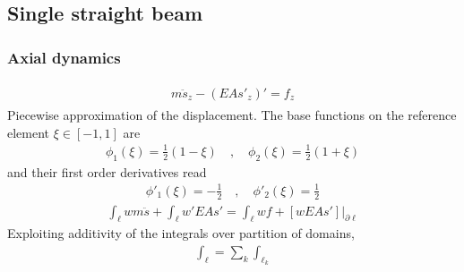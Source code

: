 \documentclass[letterpaper,10pt,english]{jupyterBook}
\begin{document}
\subsection{Single straight beam}
\label{\detokenize{ch/solids/small-displacements-fem-beams-decoupled:single-straight-beam}}

\subsubsection{Axial dynamics}
\label{\detokenize{ch/solids/small-displacements-fem-beams-decoupled:axial-dynamics}}\begin{equation*}
\begin{split}\begin{aligned}
  m \ddot{s}_z - \left( EA s'_z \right)' = f_z
\end{aligned}\end{split}
\end{equation*}
\sphinxAtStartPar
Piecewise  approximation of the displacement. The base functions on the reference element \(\xi \in [-1,1]\) are
\begin{equation*}
\begin{split}
  \phi_1(\xi) = \frac{1}{2} \left( 1 - \xi \right) \quad , \quad
  \phi_2(\xi) = \frac{1}{2} \left( 1 + \xi \right) 
\end{split}
\end{equation*}
\sphinxAtStartPar
and their first order derivatives read
\begin{equation*}
\begin{split}
  \phi'_1(\xi) = - \frac{1}{2} \quad , \quad
  \phi'_2(\xi) =   \frac{1}{2}
\end{split}
\end{equation*}
\sphinxAtStartPar
{}
\begin{equation*}
\begin{split}\int_{\ell} w m \ddot{s} + \int_{\ell} w' EA s' = \int_{\ell} w f + \left.\left[ w EA s' \right]\right|_{\partial \ell}\end{split}
\end{equation*}
\sphinxAtStartPar
{} Exploiting additivity of the integrals over partition of domains,
\begin{equation*}
\begin{split}\int_{\ell} = \sum_{k} \int_{\ell_k}\end{split}
\end{equation*}
\end{document}
